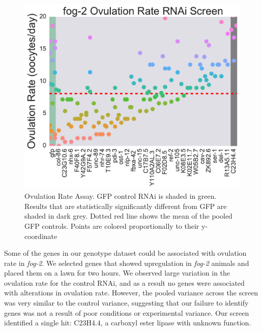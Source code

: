 \documentclass[9pt,twocolumn,twoside]{gsag3jnl}
\newcommand{\fog}{\emph{fog-2}}
\begin{document}
\begin{figure}[htbp]
\renewcommand{\familydefault}{\sfdefault}\normalfont{}
\centering
\includegraphics[width=\linewidth]{../output/figs/final_figs/oocyte_rate_assay.pdf}
\caption{Ovulation Rate Assay. GFP control RNAi is shaded in green. Results that are statistically significantly different from GFP are shaded in dark grey. Dotted red line shows the mean of the pooled GFP controls. Points are colored proportionally to their y-coordinate
}%
\label{fig:oocytedropping}
\end{figure}

Some of the genes in our genotype dataset could be associated with ovulation rate in \fog{}. We selected genes that showed upregulation in \fog{} animals and placed them on a lawn for two hours. We observed large variation in the ovulation rate for the control RNAi, and as a result no genes were associated with alterations in ovulation rate. However, the pooled variance across the screen was very similar to the control variance, suggesting that our failure to identify genes was not a result of poor conditions or experimental variance. Our screen identified a single hit: C23H4.4, a carboxyl ester lipase with unknown function.
\end{document}
